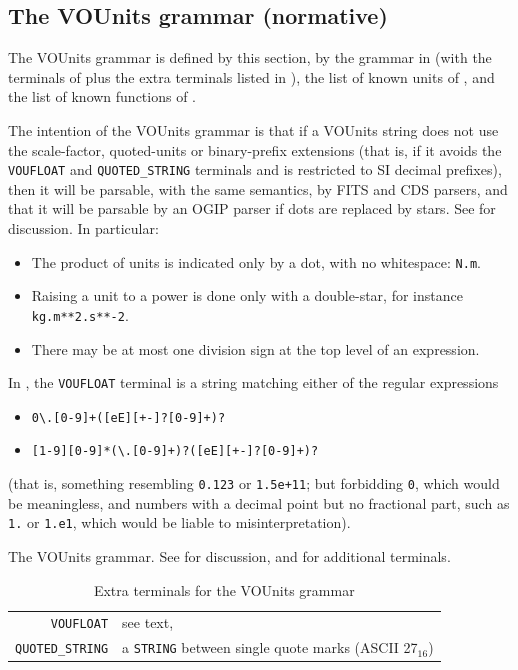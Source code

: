 \documentclass[11pt,a4paper]{ivoa}
\newcommand*\hex[1]{\uppercase{#1}${}_{16}$}
\begin{document}
\subsection{The VOUnits grammar (normative)}
\label{appx:vougrammar}

The VOUnits grammar is defined by this section,
by the grammar in 
(with the terminals of 
plus the extra terminals listed in ),
the list of known units of ,
and the list of known functions of .

The intention of the VOUnits grammar is that if a VOUnits string
does not use the scale-factor, quoted-units or binary-prefix
extensions
(that is, if it avoids the \texttt{VOUFLOAT}
and \texttt{QUOTED\_STRING} terminals and is restricted to SI decimal prefixes),
then it will be parsable, with the same semantics, by FITS
and CDS parsers, and that it will be parsable by an OGIP parser if
dots are replaced by stars.
See  for discussion.
In particular:
\begin{itemize}
\item The product of units is indicated only by a dot, with no
  whitespace: \texttt{N.m}.
\item Raising a unit to a power is done only with a double-star, for
  instance \texttt{kg.m**2.s**-2}.
\item There may be at most one division sign at the top level of an
  expression.
\end{itemize}

In , the \texttt{VOUFLOAT} terminal is a
string matching either of the regular expressions
\begin{itemize}
\item\texttt{0\textbackslash.[0-9]+([eE][+-]?[0-9]+)?}
\item\texttt{[1-9][0-9]*(\textbackslash.[0-9]+)?([eE][+-]?[0-9]+)?}
\end{itemize}
(that is, something resembling \texttt{0.123} or \texttt{1.5e+11};
but forbidding \texttt{0}, which would be meaningless, and numbers
with a decimal point but no fractional part, such as \texttt{1.}
or \texttt{1.e1}, which would be liable to misinterpretation).


\begin{table}[ht]

\caption[The VOUnits grammar]{\label{tabx:vougrammar}The VOUnits
grammar.  See  for discussion,
and  for additional terminals.}
\end{table}
\begin{table}[ht]
\begin{tabular}{rL{9cm}}
\texttt{VOUFLOAT}&see text, \\
\texttt{QUOTED\_STRING}&a \texttt{STRING} between single quote marks
    (ASCII \hex{27})
\end{tabular}
\caption[Extra VOUnits terminals]{\label{tabx:vounitsterminals}Extra terminals
for the VOUnits grammar}
\end{table}
\clearpage
\end{document}
